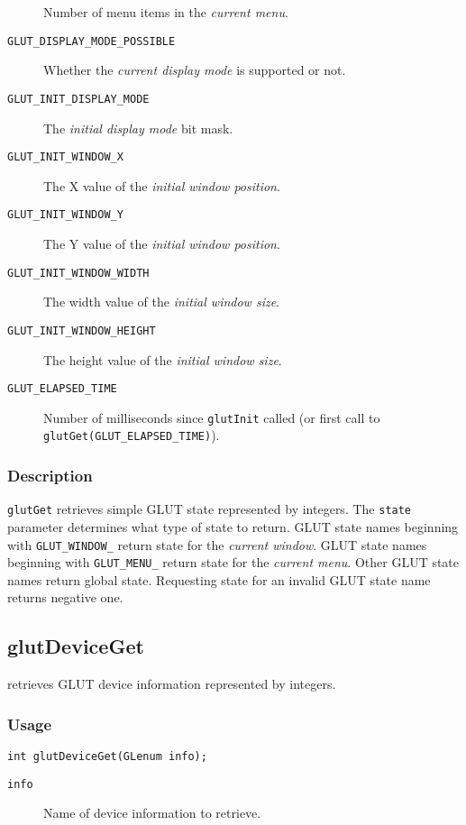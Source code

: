 \begin{description}
Number of menu items in the {\em current menu}.
\item[\tt GLUT\_DISPLAY\_MODE\_POSSIBLE]
Whether the {\em current display mode} is supported or not.
\item[\tt GLUT\_INIT\_DISPLAY\_MODE]
The {\em initial display mode} bit mask.
\item[\tt GLUT\_INIT\_WINDOW\_X]
The X value of the {\em initial window position}.
\item[\tt GLUT\_INIT\_WINDOW\_Y]
The Y value of the {\em initial window position}.
\item[\tt GLUT\_INIT\_WINDOW\_WIDTH]
The width value of the {\em initial window size}.
\item[\tt GLUT\_INIT\_WINDOW\_HEIGHT]
The height value of the {\em initial window size}.
\item[\tt GLUT\_ELAPSED\_TIME]
Number of milliseconds since {\tt glutInit} called (or first call
to {\tt glutGet(GLUT\_ELAPSED\_TIME)}).
\end{description}

\subsubsection*{Description}

{\tt glutGet} retrieves simple GLUT state represented by integers.
The {\tt state} parameter determines what type of state to
return.  GLUT state names beginning with {\tt GLUT\_WINDOW\_}
return state for the {\em current window}.  GLUT state names beginning
with {\tt GLUT\_MENU\_} return state for the {\em current menu}.
Other GLUT state names return global state.
Requesting state for an invalid GLUT state name returns negative one.

\subsection{glutDeviceGet}

 retrieves GLUT device information represented by integers.

\subsubsection*{Usage}
\begin{verbatim}
int glutDeviceGet(GLenum info);
\end{verbatim}
\begin{description}
\item[\tt info]  Name of device information to retrieve.
\itemsep 0in
\end{description}

